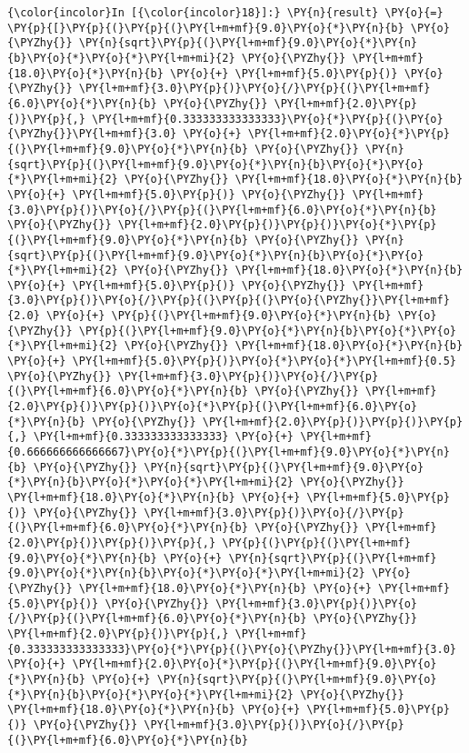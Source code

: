     \begin{Verbatim}[commandchars=\\\{\}]
{\color{incolor}In [{\color{incolor}18}]:} \PY{n}{result} \PY{o}{=} \PY{p}{[}\PY{p}{(}\PY{p}{(}\PY{l+m+mf}{9.0}\PY{o}{*}\PY{n}{b} \PY{o}{\PYZhy{}} \PY{n}{sqrt}\PY{p}{(}\PY{l+m+mf}{9.0}\PY{o}{*}\PY{n}{b}\PY{o}{*}\PY{o}{*}\PY{l+m+mi}{2} \PY{o}{\PYZhy{}} \PY{l+m+mf}{18.0}\PY{o}{*}\PY{n}{b} \PY{o}{+} \PY{l+m+mf}{5.0}\PY{p}{)} \PY{o}{\PYZhy{}} \PY{l+m+mf}{3.0}\PY{p}{)}\PY{o}{/}\PY{p}{(}\PY{l+m+mf}{6.0}\PY{o}{*}\PY{n}{b} \PY{o}{\PYZhy{}} \PY{l+m+mf}{2.0}\PY{p}{)}\PY{p}{,} \PY{l+m+mf}{0.333333333333333}\PY{o}{*}\PY{p}{(}\PY{o}{\PYZhy{}}\PY{l+m+mf}{3.0} \PY{o}{+} \PY{l+m+mf}{2.0}\PY{o}{*}\PY{p}{(}\PY{l+m+mf}{9.0}\PY{o}{*}\PY{n}{b} \PY{o}{\PYZhy{}} \PY{n}{sqrt}\PY{p}{(}\PY{l+m+mf}{9.0}\PY{o}{*}\PY{n}{b}\PY{o}{*}\PY{o}{*}\PY{l+m+mi}{2} \PY{o}{\PYZhy{}} \PY{l+m+mf}{18.0}\PY{o}{*}\PY{n}{b} \PY{o}{+} \PY{l+m+mf}{5.0}\PY{p}{)} \PY{o}{\PYZhy{}} \PY{l+m+mf}{3.0}\PY{p}{)}\PY{o}{/}\PY{p}{(}\PY{l+m+mf}{6.0}\PY{o}{*}\PY{n}{b} \PY{o}{\PYZhy{}} \PY{l+m+mf}{2.0}\PY{p}{)}\PY{p}{)}\PY{o}{*}\PY{p}{(}\PY{l+m+mf}{9.0}\PY{o}{*}\PY{n}{b} \PY{o}{\PYZhy{}} \PY{n}{sqrt}\PY{p}{(}\PY{l+m+mf}{9.0}\PY{o}{*}\PY{n}{b}\PY{o}{*}\PY{o}{*}\PY{l+m+mi}{2} \PY{o}{\PYZhy{}} \PY{l+m+mf}{18.0}\PY{o}{*}\PY{n}{b} \PY{o}{+} \PY{l+m+mf}{5.0}\PY{p}{)} \PY{o}{\PYZhy{}} \PY{l+m+mf}{3.0}\PY{p}{)}\PY{o}{/}\PY{p}{(}\PY{p}{(}\PY{o}{\PYZhy{}}\PY{l+m+mf}{2.0} \PY{o}{+} \PY{p}{(}\PY{l+m+mf}{9.0}\PY{o}{*}\PY{n}{b} \PY{o}{\PYZhy{}} \PY{p}{(}\PY{l+m+mf}{9.0}\PY{o}{*}\PY{n}{b}\PY{o}{*}\PY{o}{*}\PY{l+m+mi}{2} \PY{o}{\PYZhy{}} \PY{l+m+mf}{18.0}\PY{o}{*}\PY{n}{b} \PY{o}{+} \PY{l+m+mf}{5.0}\PY{p}{)}\PY{o}{*}\PY{o}{*}\PY{l+m+mf}{0.5} \PY{o}{\PYZhy{}} \PY{l+m+mf}{3.0}\PY{p}{)}\PY{o}{/}\PY{p}{(}\PY{l+m+mf}{6.0}\PY{o}{*}\PY{n}{b} \PY{o}{\PYZhy{}} \PY{l+m+mf}{2.0}\PY{p}{)}\PY{p}{)}\PY{o}{*}\PY{p}{(}\PY{l+m+mf}{6.0}\PY{o}{*}\PY{n}{b} \PY{o}{\PYZhy{}} \PY{l+m+mf}{2.0}\PY{p}{)}\PY{p}{)}\PY{p}{,} \PY{l+m+mf}{0.333333333333333} \PY{o}{+} \PY{l+m+mf}{0.666666666666667}\PY{o}{*}\PY{p}{(}\PY{l+m+mf}{9.0}\PY{o}{*}\PY{n}{b} \PY{o}{\PYZhy{}} \PY{n}{sqrt}\PY{p}{(}\PY{l+m+mf}{9.0}\PY{o}{*}\PY{n}{b}\PY{o}{*}\PY{o}{*}\PY{l+m+mi}{2} \PY{o}{\PYZhy{}} \PY{l+m+mf}{18.0}\PY{o}{*}\PY{n}{b} \PY{o}{+} \PY{l+m+mf}{5.0}\PY{p}{)} \PY{o}{\PYZhy{}} \PY{l+m+mf}{3.0}\PY{p}{)}\PY{o}{/}\PY{p}{(}\PY{l+m+mf}{6.0}\PY{o}{*}\PY{n}{b} \PY{o}{\PYZhy{}} \PY{l+m+mf}{2.0}\PY{p}{)}\PY{p}{)}\PY{p}{,} \PY{p}{(}\PY{p}{(}\PY{l+m+mf}{9.0}\PY{o}{*}\PY{n}{b} \PY{o}{+} \PY{n}{sqrt}\PY{p}{(}\PY{l+m+mf}{9.0}\PY{o}{*}\PY{n}{b}\PY{o}{*}\PY{o}{*}\PY{l+m+mi}{2} \PY{o}{\PYZhy{}} \PY{l+m+mf}{18.0}\PY{o}{*}\PY{n}{b} \PY{o}{+} \PY{l+m+mf}{5.0}\PY{p}{)} \PY{o}{\PYZhy{}} \PY{l+m+mf}{3.0}\PY{p}{)}\PY{o}{/}\PY{p}{(}\PY{l+m+mf}{6.0}\PY{o}{*}\PY{n}{b} \PY{o}{\PYZhy{}} \PY{l+m+mf}{2.0}\PY{p}{)}\PY{p}{,} \PY{l+m+mf}{0.333333333333333}\PY{o}{*}\PY{p}{(}\PY{o}{\PYZhy{}}\PY{l+m+mf}{3.0} \PY{o}{+} \PY{l+m+mf}{2.0}\PY{o}{*}\PY{p}{(}\PY{l+m+mf}{9.0}\PY{o}{*}\PY{n}{b} \PY{o}{+} \PY{n}{sqrt}\PY{p}{(}\PY{l+m+mf}{9.0}\PY{o}{*}\PY{n}{b}\PY{o}{*}\PY{o}{*}\PY{l+m+mi}{2} \PY{o}{\PYZhy{}} \PY{l+m+mf}{18.0}\PY{o}{*}\PY{n}{b} \PY{o}{+} \PY{l+m+mf}{5.0}\PY{p}{)} \PY{o}{\PYZhy{}} \PY{l+m+mf}{3.0}\PY{p}{)}\PY{o}{/}\PY{p}{(}\PY{l+m+mf}{6.0}\PY{o}{*}\PY{n}{b} 
\end{Verbatim}

